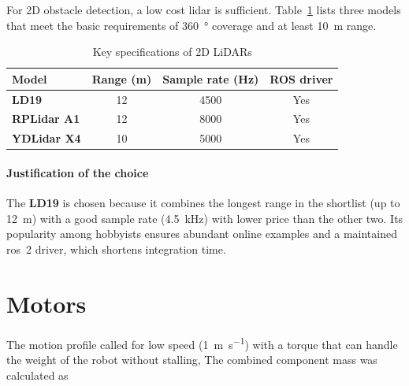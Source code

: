 For 2D obstacle detection, a low cost \gls{lidar} is sufficient.
Table~\ref{tab:lidar_comparison} lists three models that meet the basic requirements of \SI{360}{\degree} coverage and at least \SI{10}{\metre} range.

\begin{table}[H]
  \centering
  \begin{tabular}{l c c c}
    \toprule
    \textbf{Model}                     &
    \textbf{Range (\si{\metre})}       &
    \textbf{Sample rate (\si{\hertz})} &
    \textbf{ROS driver}                                  \\
    \midrule
    \textbf{LD19}                      & 12 & 4500 & Yes \\
    \textbf{RPLidar A1}                & 12 & 8000 & Yes \\
    \textbf{YDLidar X4}                & 10 & 5000 & Yes \\
    \bottomrule
  \end{tabular}
  \caption{Key specifications of 2D LiDARs}
  \label{tab:lidar_comparison}
\end{table}

\paragraph*{Justification of the choice}
The \textbf{LD19} is chosen because it combines the longest range in the shortlist (up to \SI{12}{\metre}) with a good sample rate (\SI{4.5}{\kilo\hertz}) with lower price than the other two.
Its popularity among hobbyists ensures abundant online examples and a maintained \gls{ros}~2 driver, which shortens integration time.

\section{Motors}

The motion profile called for low speed (\SI[per-mode=symbol]{1}{\meter\per\second}) with a torque that can handle the weight of the robot without stalling, The combined component mass was calculated as

